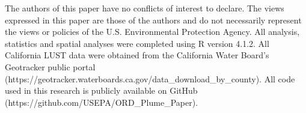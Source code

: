 \documentclass[draft,linenumbers]{agujournal2018}
\begin{document}
\acknowledgments

The authors of this paper have no conflicts of interest to declare. The
views expressed in this paper are those of the authors and do not
necessarily represent the views or policies of the U.S. Environmental
Protection Agency. All analysis, statistics and spatial analyses were
completed using R version 4.1.2. All California LUST data were obtained
from the California Water Board's Geotracker public portal
(https://geotracker.waterboards.ca.gov/data\_download\_by\_county). All
code used in this research is publicly available on GitHub
(https://github.com/USEPA/ORD\_Plume\_Paper).


\end{document}
